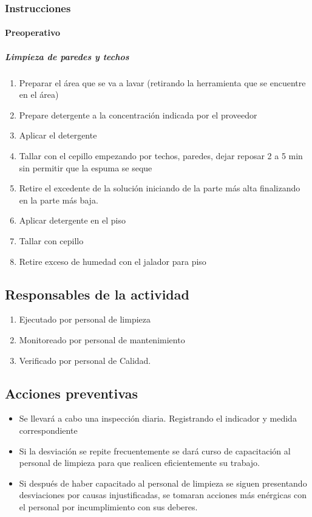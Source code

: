 \subsubsection{Instrucciones}
\paragraph{Preoperativo}
\subparagraph{Limpieza de paredes y techos}
\begin{enumerate}
	\item Preparar el área que se va a lavar (retirando la herramienta que se encuentre en el área)
	\item Prepare detergente a la concentración indicada por el proveedor
	\item Aplicar el detergente
	\item Tallar con el cepillo empezando por techos, paredes, dejar reposar 2 a 5 min sin permitir que la espuma se seque
	\item Retire el excedente de la solución iniciando de la parte más alta finalizando en la parte más baja.
	\item Aplicar detergente en el piso
	\item Tallar con cepillo
	\item Retire exceso de humedad con el jalador para piso
\end{enumerate}

\subsection{Responsables de la actividad}

\begin{enumerate}
	\item Ejecutado por personal de limpieza
	\item Monitoreado por personal de mantenimiento
	\item Verificado por personal de Calidad.
\end{enumerate}

\subsection{Acciones preventivas}

\begin{itemize}
	\item Se llevará a cabo una inspección diaria. Registrando el indicador y medida correspondiente
	\item Si la desviación se repite frecuentemente se dará curso de capacitación al personal de limpieza para que realicen eficientemente su trabajo.
	\item Si después de haber capacitado al personal de limpieza se siguen presentando desviaciones por causas injustificadas, se tomaran acciones más enérgicas con el personal por incumplimiento con sus deberes.
\end{itemize}

